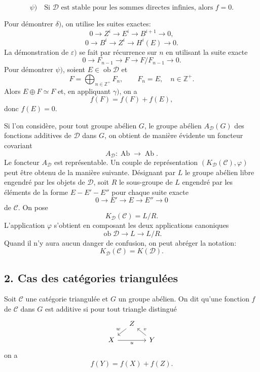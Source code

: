 \documentclass[11pt]{article}
\providecommand{\Ob}{\operatorname{ob}}
\providecommand{\cC}{\mathcal C}
\providecommand{\Ob}{\operatorname{ob}}
\providecommand{\Ab}{\operatorname{Ab}}
\providecommand{\cC}{\mathcal C}
\providecommand{\cD}{\mathcal D}
\providecommand{\Ab}{\operatorname{Ab}}
\providecommand{\Ob}{\operatorname{Ob}}
\providecommand{\Ob}{\operatorname{ob}}
\providecommand{\Ob}{\operatorname{Ob}}
\begin{document}
\[
\psi)\quad
\text{Si }\cD\text{ est stable pour les sommes directes infinies, alors }f=0.
\]

Pour démontrer $\delta)$, on utilise les suites exactes:
\[
0\longrightarrow Z^i\longrightarrow E^i\longrightarrow B^{i+1}\longrightarrow 0,
\]
\[
0\longrightarrow B^i\longrightarrow Z^i\longrightarrow H^i(E)\longrightarrow 0.
\]
La démonstration de $\varepsilon)$ se fait par récurrence sur $n$ en utilisant la suite exacte
\[
0\longrightarrow F_{n-1}\longrightarrow F\longrightarrow F/F_{n-1}\longrightarrow 0.
\]
Pour démontrer $\psi)$, soient $E\in\Ob\cD$ et
\[
F=\bigoplus_{n\in\mathbb Z^+}F_n,\qquad F_n=E,\quad n\in\mathbb Z^+.
\]
Alors $E\oplus F\simeq F$ et, en appliquant $\gamma)$, on a
\[
f(F)=f(F)+f(E),
\]
donc $f(E)=0$.

Si l'on considère, pour tout groupe abélien $G$, le groupe abélien $A_{\cD}(G)$ des fonctions additives de $\cD$ dans $G$, on obtient de manière évidente un foncteur covariant
\[
A_{\cD}:\Ab\longrightarrow\Ab.
\]
Le foncteur $A_{\cD}$ est représentable. Un couple de représentation $(K_{\cD}(\cC),\varphi)$ peut être obtenu de la manière suivante. Désignant par $L$ le groupe abélien libre engendré par les objets de $\cD$, soit $R$ le sous-groupe de $L$ engendré par les éléments de la forme $E-E'-E''$ pour chaque suite exacte
\[
0\longrightarrow E'\longrightarrow E\longrightarrow E''\longrightarrow 0
\]
de $\cC$. On pose
\[
K_{\cD}(\cC)=L/R.
\]
L'application $\varphi$ s'obtient en composant les deux applications canoniques
\[
\Ob\cD\longrightarrow L\longrightarrow L/R.
\]
Quand il n'y aura aucun danger de confusion, on peut abréger la notation:
\[
K_{\cD}(\cC)=K(\cD).
\]

\subsection*{2. Cas des catégories triangulées}

Soit $\cC$ une catégorie triangulée et $G$ un groupe abélien. On dit qu'une fonction $f$ de $\cC$ dans $G$ est additive si pour tout triangle distingué
\[
\begin{tikzcd}[column sep=small,row sep=small]
& Z \arrow[dl,"w"']\\
X \arrow[rr,"u"'] && Y \arrow[ul,"v"']
\end{tikzcd}
\]
on a
\[
f(Y)=f(X)+f(Z).
\]
\end{document}
